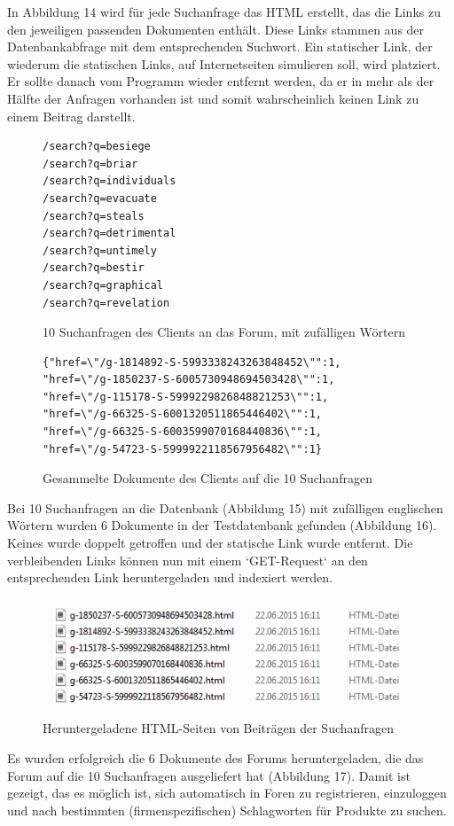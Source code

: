 In Abbildung 14 wird für jede Suchanfrage das HTML erstellt, das die Links zu den jeweiligen passenden Dokumenten enthält. Diese Links stammen aus der Datenbankabfrage mit dem entsprechenden Suchwort.
Ein statischer Link, der wiederum die statischen Links, auf Internetseiten simulieren soll, wird platziert. Er sollte danach vom Programm wieder entfernt werden, da er in mehr als der Hälfte der Anfragen vorhanden ist und somit wahrscheinlich keinen Link zu einem Beitrag darstellt.

\begin{figure}[h!]
\begin{lstlisting}[language=HTML5]
/search?q=besiege
/search?q=briar
/search?q=individuals
/search?q=evacuate
/search?q=steals
/search?q=detrimental
/search?q=untimely
/search?q=bestir
/search?q=graphical
/search?q=revelation
\end{lstlisting}
\caption{10 Suchanfragen des Clients an das Forum, mit zufälligen Wörtern}
\end{figure}

\begin{figure}[h!]
\begin{lstlisting}[language=HTML5]
{"href=\"/g-1814892-S-5993338243263848452\"":1,
"href=\"/g-1850237-S-6005730948694503428\"":1,
"href=\"/g-115178-S-5999229826848821253\"":1,
"href=\"/g-66325-S-6001320511865446402\"":1,
"href=\"/g-66325-S-6003599070168440836\"":1,
"href=\"/g-54723-S-5999922118567956482\"":1}
\end{lstlisting}
\caption{Gesammelte Dokumente des Clients auf die 10 Suchanfragen}
\end{figure}

Bei 10 Suchanfragen an die Datenbank (Abbildung 15) mit zufälligen englischen Wörtern wurden 6 Dokumente in der Testdatenbank gefunden (Abbildung 16). Keines wurde doppelt getroffen und der statische Link wurde entfernt. Die verbleibenden Links können nun mit einem `GET-Request` an den entsprechenden Link heruntergeladen und indexiert werden.
\newpage

\begin{figure}[h!]
\includegraphics{./images/postdownload.png}
\caption{Heruntergeladene HTML-Seiten von Beiträgen der Suchanfragen}
\end{figure}


Es wurden erfolgreich die 6 Dokumente des Forums heruntergeladen, die das Forum auf die 10 Suchanfragen ausgeliefert hat (Abbildung 17).
Damit ist gezeigt, das es möglich ist, sich automatisch in Foren zu registrieren, einzuloggen und nach bestimmten (firmenspezifischen) Schlagworten für Produkte zu suchen.
\newpage

